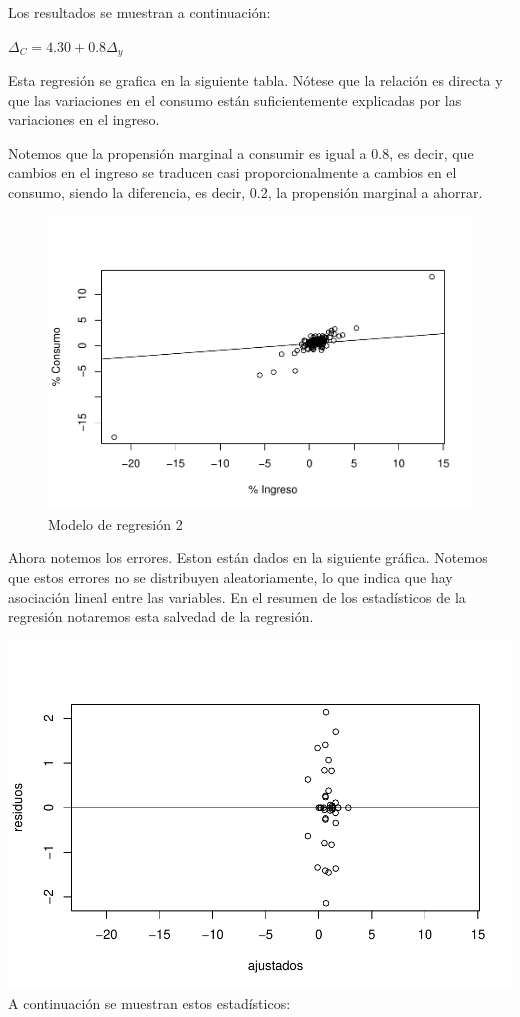 \documentclass[
]{article}
\begin{document}
Los resultados se muestran a continuación:

\(\Delta_C=4.30+0.8\Delta_y\)

Esta regresión se grafica en la siguiente tabla. Nótese que la relación
es directa y que las variaciones en el consumo están suficientemente
explicadas por las variaciones en el ingreso.

Notemos que la propensión marginal a consumir es igual a 0.8, es decir,
que cambios en el ingreso se traducen casi proporcionalmente a cambios
en el consumo, siendo la diferencia, es decir, 0.2, la propensión
marginal a ahorrar.

\begin{figure}
\centering
\includegraphics{Ejercicio-3_files/figure-latex/unnamed-chunk-14-1.pdf}
\caption{Modelo de regresión 2}
\end{figure}

Ahora notemos los errores. Eston están dados en la siguiente gráfica.
Notemos que estos errores no se distribuyen aleatoriamente, lo que
indica que hay asociación lineal entre las variables. En el resumen de
los estadísticos de la regresión notaremos esta salvedad de la
regresión.

\includegraphics{Ejercicio-3_files/figure-latex/unnamed-chunk-15-1.pdf}
A continuación se muestran estos estadísticos:
\end{document}
